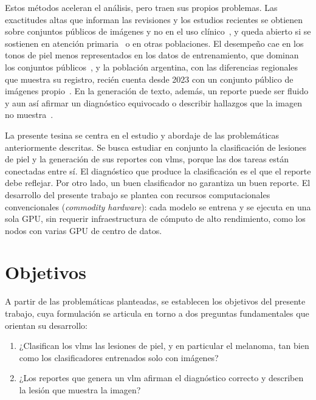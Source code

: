 Estos métodos aceleran el análisis, pero traen sus propios problemas. Las exactitudes altas que informan las
revisiones y los estudios recientes se obtienen sobre conjuntos públicos de imágenes y no en el uso
clínico~\cite{magalhaes2024systematic,kreouzi2024learning}, y queda
abierto si se sostienen en atención primaria~\cite{jones2022intelligence} o en otras poblaciones. El desempeño
cae en los tonos de piel menos representados en los datos de entrenamiento, que dominan los conjuntos
públicos~\cite{daneshjou2022disparities,groh2021neural}, y la población argentina, con las diferencias
regionales que muestra su registro, recién cuenta desde 2023 con un conjunto público de imágenes
propio~\cite{riccilara2023dataset}. En la generación de
texto, además, un reporte puede ser fluido y aun así afirmar un diagnóstico equivocado o describir hallazgos que
la imagen no muestra~\cite{bai2024hallucination}.

La presente tesina se centra en el estudio y abordaje de las problemáticas anteriormente descritas. Se busca
estudiar en conjunto la clasificación de lesiones de piel y la generación de sus reportes con \glspl{vlm},
porque las dos tareas están conectadas entre sí. El diagnóstico que produce la clasificación es el que el
reporte debe reflejar. Por otro lado, un buen clasificador no garantiza un buen reporte. El desarrollo del
presente trabajo se plantea con recursos computacionales convencionales (\emph{commodity hardware}): cada
modelo se entrena y se ejecuta en una sola GPU, sin requerir infraestructura de cómputo de alto rendimiento,
como los nodos con varias GPU de centro de datos.

\section{Objetivos}
\label{sec:intro_objetivos}
A partir de las problemáticas planteadas, se establecen los objetivos del presente trabajo, cuya formulación
se articula en torno a dos preguntas fundamentales que orientan su desarrollo:
\begin{enumerate}[label=\textbf{PI\arabic*.}]
  \item ¿Clasifican los \glspl{vlm} las lesiones de piel, y en particular el melanoma, tan bien como los
  clasificadores entrenados solo con imágenes?
  \item ¿Los reportes que genera un \gls{vlm} afirman el diagnóstico correcto y describen la lesión que muestra
  la imagen?
\end{enumerate}


